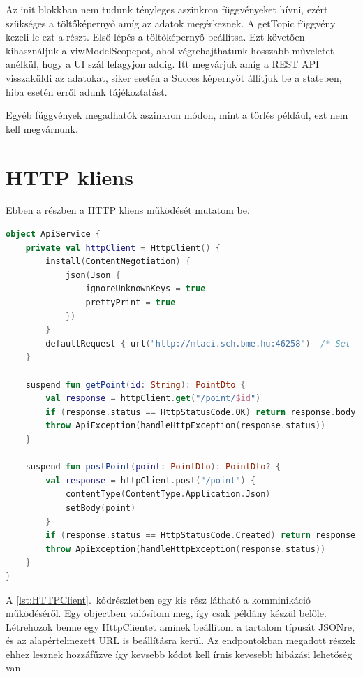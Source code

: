 Az init{} blokkban nem tudunk tényleges aszinkron függvényeket hívni, ezért szükséges a töltőképernyő amíg az adatok megérkeznek.
A getTopic függvény kezeli le ezt a részt. Első lépés a töltőképernyő beállítsa. Ezt követően kihasználjuk a viwModelScopepot, ahol végrehajthatunk hosszabb műveletet anélkül, hogy a UI szál lefagyjon addig.
Itt megvárjuk amíg a REST API visszaküldi az adatokat, siker esetén a Succes képernyőt állítjuk be a stateben, hiba esetén erről adunk tájékoztatást.

Egyéb függvények megadhatók aszinkron módon, mint a törlés például, ezt nem kell megvárnunk.

\section{HTTP kliens}
\label{sec:HTTP}

Ebben a részben a HTTP kliens működését mutatom be.

\begin{lstlisting}[caption={HTTP kliens.}, label={lst:HTTPClient}, language=Kotlin]
object ApiService {
    private val httpClient = HttpClient() {
        install(ContentNegotiation) {
            json(Json {
                ignoreUnknownKeys = true
                prettyPrint = true
            })
        }
        defaultRequest { url("http://mlaci.sch.bme.hu:46258")  /* Set the base URL */ }
    }
    
    suspend fun getPoint(id: String): PointDto {
        val response = httpClient.get("/point/$id")
        if (response.status == HttpStatusCode.OK) return response.body()
        throw ApiException(handleHttpException(response.status))
    }

    suspend fun postPoint(point: PointDto): PointDto? {
        val response = httpClient.post("/point") {
            contentType(ContentType.Application.Json)
            setBody(point)
        }
        if (response.status == HttpStatusCode.Created) return response.body()
        throw ApiException(handleHttpException(response.status))
    }
}
\end{lstlisting}


A \ref{lst:HTTPClient}.~kódrészletben egy kis rész látható a komminikáció működéséről.
Egy objectben valósítom meg, így csak példány készül belőle.
Létrehozok benne egy HttpClientet aminek beállítom a tartalom típusát JSONre, és az alapértelmezett URL is beállításra kerül. 
Az endpontokban megadott részek ehhez lesznek hozzáfűzve így kevsebb kódot kell írnis kevesebb hibázási lehetőség van.

